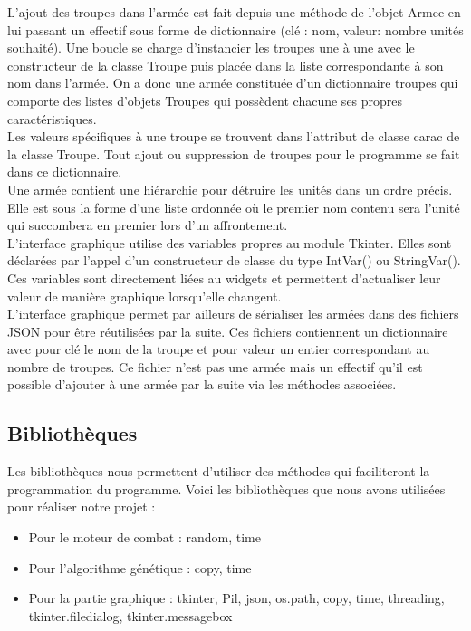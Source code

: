 \documentclass[a4paper]{article} %
\begin{document}
L'ajout des troupes dans l'armée est fait depuis une méthode de l'objet Armee en lui passant un effectif sous forme de dictionnaire (clé : nom, valeur: nombre unités souhaité). Une boucle se charge d'instancier les troupes une à une avec le constructeur de la classe Troupe puis placée dans la liste correspondante à son nom dans l'armée. On a donc une armée constituée d'un dictionnaire troupes qui comporte des listes d'objets Troupes qui possèdent chacune ses propres caractéristiques.\\

Les valeurs spécifiques à une troupe se trouvent dans l'attribut de classe carac de la classe Troupe. Tout ajout ou suppression de troupes pour le programme se fait dans ce dictionnaire.\\

Une armée contient une hiérarchie pour détruire les unités dans un ordre précis. Elle est sous la forme d'une liste ordonnée où le premier nom contenu sera l'unité qui succombera en premier lors d'un affrontement.\\

L'interface graphique utilise des variables propres au module Tkinter. Elles sont déclarées par l'appel d'un constructeur de classe du type IntVar() ou StringVar(). Ces variables sont directement liées au widgets et permettent d'actualiser leur valeur de manière graphique lorsqu'elle changent.\\

L'interface graphique permet par ailleurs de sérialiser les armées dans des fichiers JSON pour être réutilisées par la suite. Ces fichiers contiennent un dictionnaire avec pour clé le nom de la troupe et pour valeur un entier correspondant au nombre de troupes. Ce fichier n'est pas une armée mais un effectif qu'il est possible d'ajouter à une armée par la suite via les méthodes associées.

	\subsection{Bibliothèques}\label{bibliothèques}
Les bibliothèques nous permettent d'utiliser des méthodes qui faciliteront la programmation du programme. Voici les bibliothèques que nous avons utilisées pour réaliser notre projet : 
\begin{itemize}
	\item Pour le moteur de combat : random, time 
	\item Pour l'algorithme génétique : copy, time 
	\item Pour la partie graphique : tkinter, Pil, json, os.path, copy, time, threading, tkinter.filedialog, tkinter.messagebox
\end{itemize}
\end{document}
